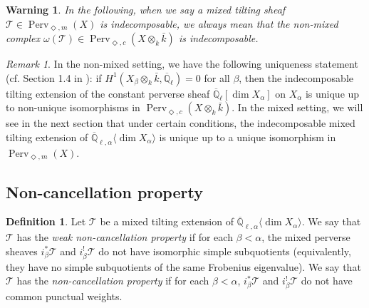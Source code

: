 \documentclass{amsart}
\theoremstyle{plain}
\newtheorem*{warning}{Warning}
\theoremstyle{definition}
\newtheorem{defn}[subsubsection]{Definition}
\theoremstyle{remark}
\newtheorem*{remark}{Remark}
\numberwithin{equation}{subsection}
\begin{document}
\begin{warning}
In the following, when we say a mixed tilting sheaf ${\mathcal{T}}\in{\operatorname{Perv}_{\Diamond,m}({X})}$ is {\em indecomposable}, we always mean that the non-mixed complex $\omega({\mathcal{T}})\in{\operatorname{Perv}_{\Diamond,c}({{{X}}\otimes_k\bar{k}})}$ is indecomposable.
\end{warning}

\begin{remark}
In the non-mixed setting, we have the following uniqueness statement (cf. Section 1.4 in \cite{BBM}): if $H^1({{X_\beta}\otimes_k\bar{k}},{\overline{\mathbb{Q}}_{\ell}})=0$ for all $\beta$, then the indecomposable tilting extension of the constant perverse sheaf ${\overline{\mathbb{Q}}_{\ell}}[\dim X_\alpha]$ on $X_\alpha$ is unique up to non-unique isomorphisms in ${\operatorname{Perv}_{\Diamond,c}({{{X}}\otimes_k\bar{k}})}$. In the mixed setting, we will see in the next section that under certain conditions, the indecomposable mixed tilting extension of ${\overline{\mathbb{Q}}_{\ell,\alpha}{\langle{{\dim X_\alpha}}\rangle}}$ is unique up to a unique isomorphism in ${\operatorname{Perv}_{\Diamond,m}({X})}$.
\end{remark}

\subsection{Non-cancellation property}\label{ss:nonc}

\begin{defn}\label{d:noncancel}
Let ${\mathcal{T}}$ be a mixed tilting extension of ${\overline{\mathbb{Q}}_{\ell,\alpha}{\langle{{\dim X_\alpha}}\rangle}}$. We say that ${\mathcal{T}}$ has the {\em weak non-cancellation property} if for each $\beta<\alpha$, the mixed perverse sheaves $i_\beta^*{\mathcal{T}}$ and $i_\beta^!{\mathcal{T}}$ do not have isomorphic simple subquotients (equivalently, they have no simple subquotients of the same Frobenius eigenvalue). We say that ${\mathcal{T}}$ has the {\em non-cancellation property} if for each $\beta<\alpha$, $i_\beta^*{\mathcal{T}}$ and $i_\beta^!{\mathcal{T}}$ do not have common punctual weights.
\end{defn}
\end{document}
